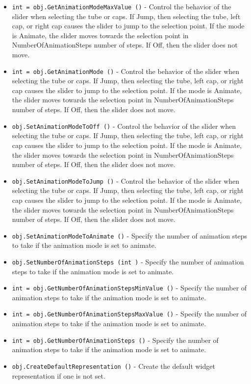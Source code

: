\begin{itemize}
\item  \verb|int = obj.GetAnimationModeMaxValue ()| -  Control the behavior of the slider when selecting the tube or caps. If
 Jump, then selecting the tube, left cap, or right cap causes the slider to
 jump to the selection point. If the mode is Animate, the slider moves
 towards the selection point in NumberOfAnimationSteps number of steps.
 If Off, then the slider does not move.

\item  \verb|int = obj.GetAnimationMode ()| -  Control the behavior of the slider when selecting the tube or caps. If
 Jump, then selecting the tube, left cap, or right cap causes the slider to
 jump to the selection point. If the mode is Animate, the slider moves
 towards the selection point in NumberOfAnimationSteps number of steps.
 If Off, then the slider does not move.

\item  \verb|obj.SetAnimationModeToOff ()| -  Control the behavior of the slider when selecting the tube or caps. If
 Jump, then selecting the tube, left cap, or right cap causes the slider to
 jump to the selection point. If the mode is Animate, the slider moves
 towards the selection point in NumberOfAnimationSteps number of steps.
 If Off, then the slider does not move.

\item  \verb|obj.SetAnimationModeToJump ()| -  Control the behavior of the slider when selecting the tube or caps. If
 Jump, then selecting the tube, left cap, or right cap causes the slider to
 jump to the selection point. If the mode is Animate, the slider moves
 towards the selection point in NumberOfAnimationSteps number of steps.
 If Off, then the slider does not move.

\item  \verb|obj.SetAnimationModeToAnimate ()| -  Specify the number of animation steps to take if the animation mode
 is set to animate.

\item  \verb|obj.SetNumberOfAnimationSteps (int )| -  Specify the number of animation steps to take if the animation mode
 is set to animate.

\item  \verb|int = obj.GetNumberOfAnimationStepsMinValue ()| -  Specify the number of animation steps to take if the animation mode
 is set to animate.

\item  \verb|int = obj.GetNumberOfAnimationStepsMaxValue ()| -  Specify the number of animation steps to take if the animation mode
 is set to animate.

\item  \verb|int = obj.GetNumberOfAnimationSteps ()| -  Specify the number of animation steps to take if the animation mode
 is set to animate.

\item  \verb|obj.CreateDefaultRepresentation ()| -  Create the default widget representation if one is not set. 

\end{itemize}
